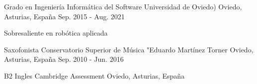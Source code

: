 

\begin{cventries}

  \cventry
    {Grado en Ingeniería Informática del Software} %
    {Universidad de Oviedo)} %
    {Oviedo, Asturias, España} %
    {Sep. 2015 - Aug. 2021} %
    {
      \begin{cvitems} %
        \item {Sobresaliente en robótica aplicada}
      \end{cvitems}
    }

    \cventry
    {Saxofonista} %
    {Conservatorio Superior de Música "Eduardo Martínez Torner} %
    {Oviedo, Asturias, España} %
    {Sep. 2010 - Jun. 2016} %
    {
      \begin{cvitems} %
      \end{cvitems}
    }

    \cventry
    {B2 Ingles} %
    {Cambridge Assessment} %
    {Oviedo, Asturias, España} %
    {} %
    {
      \begin{cvitems} %
      \end{cvitems}
    }

\end{cventries}
